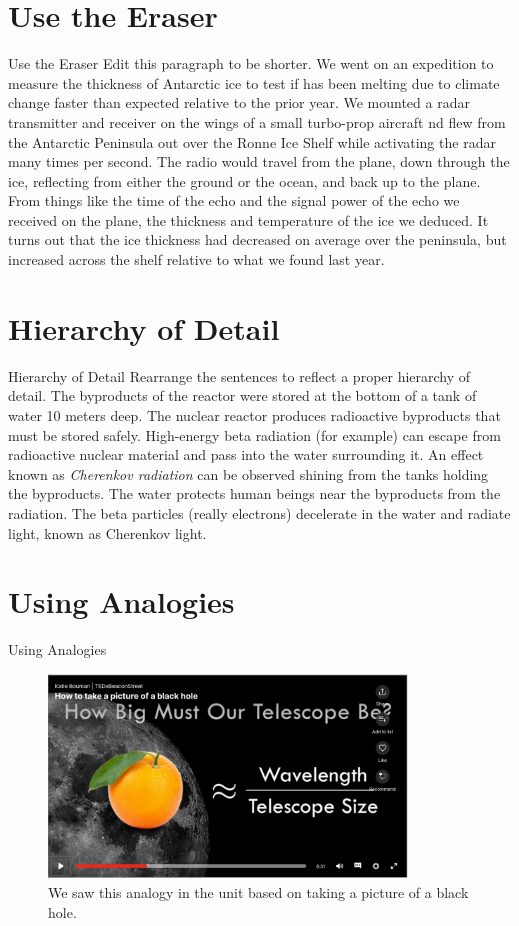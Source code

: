 \documentclass{beamer}
\begin{document}
\section{Use the Eraser}

\begin{frame}{Use the Eraser}
\small
\alert{Edit this paragraph to be shorter.}
We went on an expedition to measure the thickness of Antarctic ice to test if has been melting due to climate change faster than expected relative to the prior year.  We mounted a radar transmitter and receiver on the wings of a small turbo-prop aircraft nd flew from the Antarctic Peninsula out over the Ronne Ice Shelf while activating the radar many times per second.  The radio would travel from the plane, down through the ice, reflecting from either the ground or the ocean, and back up to the plane.  From things like the time of the echo and the signal power of the echo we received on the plane, the thickness and temperature of the ice we deduced.  It turns out that the ice thickness had decreased on average over the peninsula, but increased across the shelf relative to what we found last year.
\end{frame}

\section{Hierarchy of Detail}

\begin{frame}{Hierarchy of Detail}
\small
\alert{Rearrange the sentences to reflect a proper hierarchy of detail.}
The byproducts of the reactor were stored at the bottom of a tank of water 10 meters deep.  The nuclear reactor produces radioactive byproducts that must be stored safely.  High-energy beta radiation (for example) can escape from radioactive nuclear material and pass into the water surrounding it.  An effect known as \textit{Cherenkov radiation} can be observed shining from the tanks holding the byproducts. The water protects human beings near the byproducts from the radiation.  The beta particles (really electrons) decelerate in the water and radiate light, known as Cherenkov light.
\end{frame}

\section{Using Analogies}

\begin{frame}{Using Analogies}
\begin{figure}
\centering
\includegraphics[width=0.85\textwidth]{figures/orange.png}
\caption{\label{fig:orange} We saw this analogy in the unit based on taking a picture of a black hole.}
\end{figure}
\end{frame}
\end{document}
